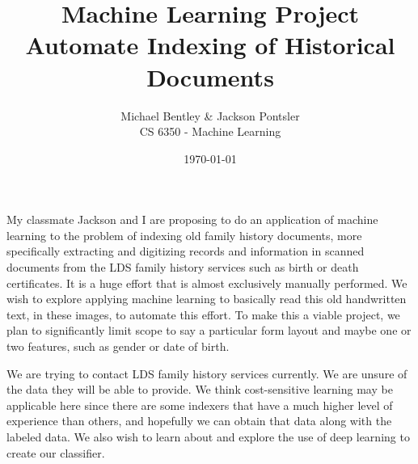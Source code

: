 \documentclass{article}
\author{
  Michael Bentley \& Jackson Pontsler \\
  CS 6350 - Machine Learning
  }
\title{
  Machine Learning Project \\
  Automate Indexing of Historical Documents
  }
\date{\today}
\begin{document}
\maketitle

My classmate Jackson and I are proposing to do an application of machine learning to the problem of indexing old family history documents, more specifically extracting and digitizing records and information in scanned documents from the LDS family history services such as birth or death certificates.  It is a huge effort that is almost exclusively manually performed. We wish to explore applying machine learning to basically read this old handwritten text, in these images, to automate this effort. To make this a viable project, we plan to significantly limit scope to say a particular form layout and maybe one or two features, such as gender or date of birth.

We are trying to contact LDS family history services currently.  We are unsure of the data they will be able to provide.  We think cost-sensitive learning may be applicable here since there are some indexers that have a much higher level of experience than others, and hopefully we can obtain that data along with the labeled data.  We also wish to learn about and explore the use of deep learning to create our classifier.
\end{document}
